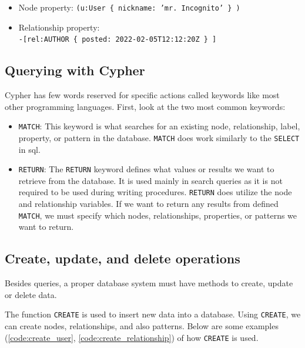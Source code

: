 \begin{itemize}
    \item {Node property: \texttt{(u:User \{ nickname: 'mr. Incognito' \} )}}
    \item {Relationship property: \\\texttt{-[rel:AUTHOR \{ posted: 2022-02-05T12:12:20Z \} ]}}
\end{itemize}

\subsection{Querying with Cypher}

Cypher has few words reserved for specific actions called keywords like most other programming languages. \cite{noauthor_querying_nodate}
First, look at the two most common keywords:
\begin{itemize}
    \item {\texttt{MATCH}: This keyword is what searches for an existing node, relationship, label, property, or pattern in the database.
          \texttt{MATCH} does work similarly to the \texttt{SELECT} in \acrshort{sql}.}
    \item {\texttt{RETURN}: The \texttt{RETURN} keyword defines what values or results we want to retrieve from the database.
          It is used mainly in search queries as it is not required to be used during writing procedures.
          \texttt{RETURN} does utilize the node and relationship variables. If we want to return any results from defined \texttt{MATCH},
          we must specify which nodes, relationships, properties, or patterns we want to return.}
\end{itemize}

\subsection{Create, update, and delete operations}

Besides queries, a proper database system must have methods to create, update or delete data.

The function \texttt{CREATE} is used to insert new data into a database.
Using \texttt{CREATE}, we can create nodes, relationships, and also patterns.
Below are some examples (\ref{code:create_user}, \ref{code:create_relationship}) of how \texttt{CREATE} is used. \cite{noauthor_updating_nodate}


